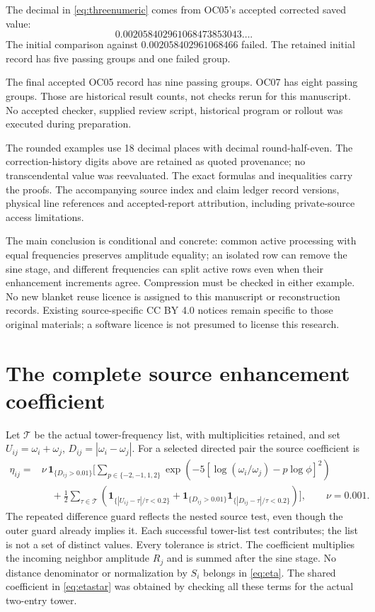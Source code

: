 \documentclass[11pt,a4paper]{article}
\theoremstyle{definition}
\theoremstyle{remark}\newtheorem{remark}[theorem]{Remark}
\newcommand{\ind}{\mathbf 1}
\numberwithin{equation}{section}
\begin{document}
The decimal in \eqref{eq:threenumeric} comes from OC05's accepted corrected saved value:
\[
 0.002058402961068473853043\ldots .
\]
The initial comparison against $0.002058402961068466$ failed.
The retained initial record has five passing groups and one failed group.

The final accepted OC05 record has nine passing groups.
OC07 has eight passing groups. Those are historical result counts, not checks
rerun for this manuscript. No accepted checker, supplied review script, historical
program or rollout was executed during preparation.

The rounded examples use 18 decimal places with decimal round-half-even.
The correction-history digits above are retained as quoted provenance; no transcendental
value was reevaluated.
The exact formulas and inequalities carry the proofs. The accompanying source index
and claim ledger record versions, physical line references and accepted-report
attribution, including private-source access limitations.

The main conclusion is conditional and concrete: common active processing with
equal frequencies preserves amplitude equality; an isolated row can remove the sine
stage, and different frequencies can split active rows even when their enhancement
increments agree. Compression must be checked in either example.
No new blanket reuse licence is assigned to this manuscript or reconstruction
records. Existing source-specific CC BY 4.0 notices remain specific to those original
materials; a software licence is not presumed to license this research.

\appendix
\section{The complete source enhancement coefficient}\label{app:eta}
Let $\mathcal T$ be the actual tower-frequency list, with multiplicities retained,
and set
$U_{ij}=\omega_i+\omega_j$, $D_{ij}=|\omega_i-\omega_j|$.
For a selected directed pair the source coefficient is
\begin{equation}\label{eq:eta}
\begin{split}
 \eta_{ij}={}&\nu\,\ind_{\{D_{ij}>0.01\}}
 \Bigg[
 \sum_{p\in\{-2,-1,1,2\}}
 \exp\!\left(-5[\log(\omega_i/\omega_j)-p\log\phi]^2\right)\\
 &\quad+\frac12\sum_{\tau\in\mathcal T}
 \left(
 \ind_{\{|U_{ij}-\tau|/\tau<0.2\}}
 +\ind_{\{D_{ij}>0.01\}}
  \ind_{\{|D_{ij}-\tau|/\tau<0.2\}}
 \right)
 \Bigg],\qquad \nu=0.001.
\end{split}
\end{equation}
The repeated difference guard reflects the nested source test, even though the
outer guard already implies it. Each successful tower-list test contributes;
the list is not a set of distinct values. Every tolerance is strict.
The coefficient multiplies the incoming neighbor amplitude $R_j$ and is summed
after the sine stage. No distance denominator or normalization by $S_i$ belongs
in \eqref{eq:eta}. The shared coefficient in \eqref{eq:etastar} was obtained by
checking all these terms for the actual two-entry tower.
\end{document}
